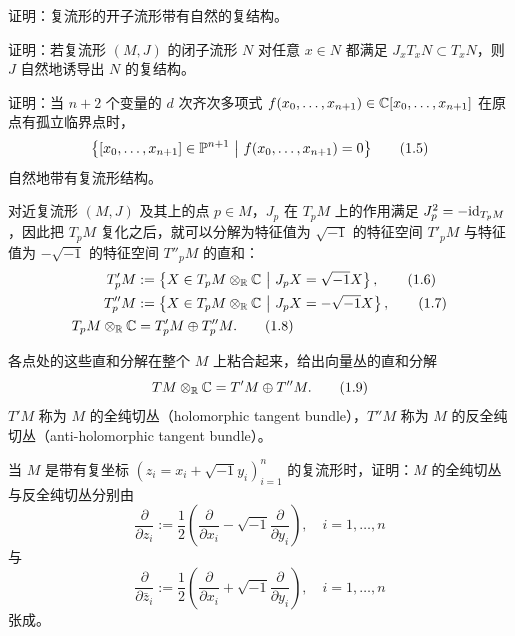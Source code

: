 \begin{exercise}
证明：复流形的开子流形带有自然的复结构。
\end{exercise}

\begin{exercise}
证明：若复流形 $(M,J)$ 的闭子流形 $N$ 对任意 $x\in N$ 都满足 $J_xT_xN\subset T_xN$，则 $J$ 自然地诱导出 $N$ 的复结构。
\end{exercise}

\begin{exercise}
证明：当 $n+2$ 个变量的 $d$ 次齐次多项式 $f(x_0,\ldots,x_{n+1})\in\mathbb{C}[x_0,\ldots,x_{n+1}]$ 在原点有孤立临界点时，
\begin{equation}
    \bigl\{[x_0,\ldots,x_{n+1}]\in\PP^{n+1}\ \big|\ f(x_0,\ldots,x_{n+1})=0\bigr\} \tag{1.5}
\end{equation}
自然地带有复流形结构。
\end{exercise}

对近复流形 $(M,J)$ 及其上的点 $p\in M$，$J_p$ 在 $T_pM$ 上的作用满足 $J_p^2=-\mathrm{id}_{T_pM}$，因此把 $T_pM$ 复化之后，就可以分解为特征值为 $\sqrt{-1}$ 的特征空间 $T'_pM$ 与特征值为 $-\sqrt{-1}$ 的特征空间 $T''_pM$ 的直和：
\begin{align}
    T'_pM &:= \left\{X\in T_pM\otimes_\R\C \ \middle|\ J_pX=\sqrt{-1}X\right\}, \tag{1.6}\\
    T''_pM &:= \left\{X\in T_pM\otimes_\R\C \ \middle|\ J_pX=-\sqrt{-1}X\right\}, \tag{1.7}\\
    T_pM\otimes_\R\C &= T'_pM\oplus T''_pM. \tag{1.8}
\end{align}

各点处的这些直和分解在整个 $M$ 上粘合起来，给出向量丛的直和分解
\begin{equation}
    TM\otimes_{\mathbb{R}}\mathbb{C} = T'M\oplus T''M. \tag{1.9}
\end{equation}
$T'M$ 称为 $M$ 的全纯切丛（holomorphic tangent bundle），$T''M$ 称为 $M$ 的反全纯切丛（anti-holomorphic tangent bundle）。

\begin{exercise}
当 $M$ 是带有复坐标 $(z_i=x_i+\sqrt{-1}y_i)_{i=1}^n$ 的复流形时，证明：$M$ 的全纯切丛与反全纯切丛分别由
\begin{equation}
    \frac{\partial}{\partial z_i} := \frac{1}{2}\left(\frac{\partial}{\partial x_i}-\sqrt{-1}\frac{\partial}{\partial y_i}\right),\quad i=1,\ldots,n \tag{1.10}
\end{equation}
与
\begin{equation}
    \frac{\partial}{\partial\bar z_i} := \frac{1}{2}\left(\frac{\partial}{\partial x_i}+\sqrt{-1}\frac{\partial}{\partial y_i}\right),\quad i=1,\ldots,n \tag{1.11}
\end{equation}
张成。
\end{exercise}

